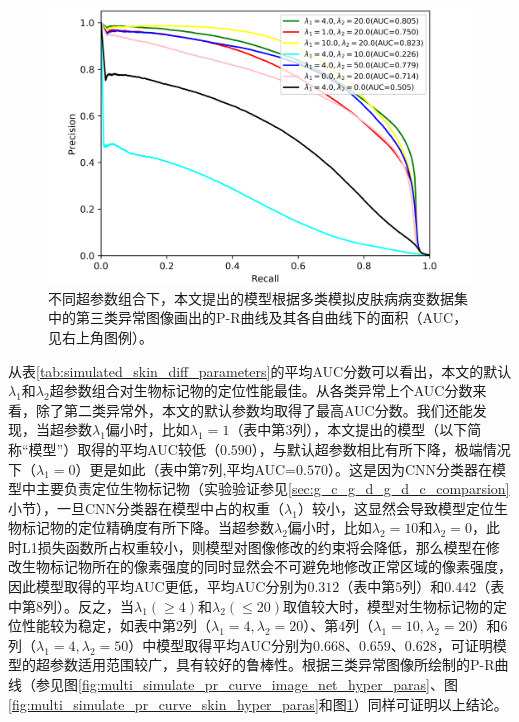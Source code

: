 \vspace{-0.8cm}
\begin{figure}[H]
	\centering
	\includegraphics[width=1.0\textwidth]{figure/pr_curve_multi_skin_hyper_paras/CIRCLE_pr_curve.png}
	\caption{不同超参数组合下，本文提出的模型根据多类模拟皮肤病病变数据集中的第三类异常图像画出的P-R曲线及其各自曲线下的面积（AUC，见右上角图例）。} 
	\label{fig:multi_simulate_pr_curve_circle_hyper_paras}
\end{figure}


从表\ref{tab:simulated_skin_diff_parameters}的平均AUC分数可以看出，本文的默认$\lambda_{1}$和$\lambda_{2}$超参数组合对生物标记物的定位性能最佳。从各类异常上个AUC分数来看，除了第二类异常外，本文的默认参数均取得了最高AUC分数。我们还能发现，当超参数$\lambda_{1}$偏小时，比如$\lambda_{1}=1$（表中第$3$列），本文提出的模型（以下简称“模型”）取得的平均AUC较低（$0.590$），与默认超参数相比有所下降，极端情况下（$\lambda_{1}=0$）更是如此（表中第$7$列,平均AUC=$0.570$）。这是因为CNN分类器在模型中主要负责定位生物标记物（实验验证参见\ref{sec:g_c_g_d_g_d_c_comparsion}小节），一旦CNN分类器在模型中占的权重（$\lambda_{1}$）较小，这显然会导致模型定位生物标记物的定位精确度有所下降。当超参数$\lambda_{2}$偏小时，比如$\lambda_{2}=10$和$\lambda_2=0$，此时L1损失函数所占权重较小，则模型对图像修改的约束将会降低，那么模型在修改生物标记物所在的像素强度的同时显然会不可避免地修改正常区域的像素强度，因此模型取得的平均AUC更低，平均AUC分别为$0.312$（表中第$5$列）和$0.442$（表中第8列）。反之，当$\lambda_{1}(\ge 4)$和$\lambda_{2}(\le 20)$取值较大时，模型对生物标记物的定位性能较为稳定，如表中第$2$列（$\lambda_{1}=4, \lambda_{2}=20$）、第$4$列（$\lambda_{1}=10, \lambda_{2}=20$）和$6$列（$\lambda_{1}=4, \lambda_{2}=50$）中模型取得平均AUC分别为$0.668$、$0.659$、$0.628$，可证明模型的超参数适用范围较广，具有较好的鲁棒性。根据三类异常图像所绘制的P-R曲线（参见图\ref{fig:multi_simulate_pr_curve_image_net_hyper_paras}、图\ref{fig:multi_simulate_pr_curve_skin_hyper_paras}和图\ref{fig:multi_simulate_pr_curve_circle_hyper_paras}）同样可证明以上结论。

